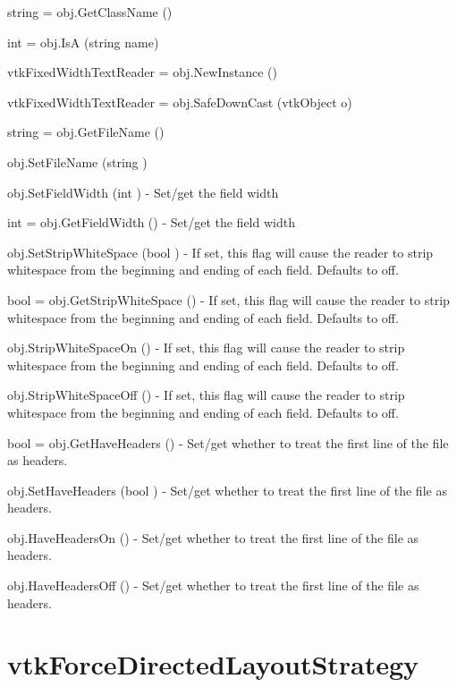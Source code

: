 \begin{DoxyItemize}
\item {\ttfamily string = obj.\-Get\-Class\-Name ()}  
\item {\ttfamily int = obj.\-Is\-A (string name)}  
\item {\ttfamily vtk\-Fixed\-Width\-Text\-Reader = obj.\-New\-Instance ()}  
\item {\ttfamily vtk\-Fixed\-Width\-Text\-Reader = obj.\-Safe\-Down\-Cast (vtk\-Object o)}  
\item {\ttfamily string = obj.\-Get\-File\-Name ()}  
\item {\ttfamily obj.\-Set\-File\-Name (string )}  
\item {\ttfamily obj.\-Set\-Field\-Width (int )} -\/ Set/get the field width  
\item {\ttfamily int = obj.\-Get\-Field\-Width ()} -\/ Set/get the field width  
\item {\ttfamily obj.\-Set\-Strip\-White\-Space (bool )} -\/ If set, this flag will cause the reader to strip whitespace from the beginning and ending of each field. Defaults to off.  
\item {\ttfamily bool = obj.\-Get\-Strip\-White\-Space ()} -\/ If set, this flag will cause the reader to strip whitespace from the beginning and ending of each field. Defaults to off.  
\item {\ttfamily obj.\-Strip\-White\-Space\-On ()} -\/ If set, this flag will cause the reader to strip whitespace from the beginning and ending of each field. Defaults to off.  
\item {\ttfamily obj.\-Strip\-White\-Space\-Off ()} -\/ If set, this flag will cause the reader to strip whitespace from the beginning and ending of each field. Defaults to off.  
\item {\ttfamily bool = obj.\-Get\-Have\-Headers ()} -\/ Set/get whether to treat the first line of the file as headers.  
\item {\ttfamily obj.\-Set\-Have\-Headers (bool )} -\/ Set/get whether to treat the first line of the file as headers.  
\item {\ttfamily obj.\-Have\-Headers\-On ()} -\/ Set/get whether to treat the first line of the file as headers.  
\item {\ttfamily obj.\-Have\-Headers\-Off ()} -\/ Set/get whether to treat the first line of the file as headers.  
\end{DoxyItemize}\hypertarget{vtkinfovis_vtkforcedirectedlayoutstrategy}{}\section{vtk\-Force\-Directed\-Layout\-Strategy}\label{vtkinfovis_vtkforcedirectedlayoutstrategy}

